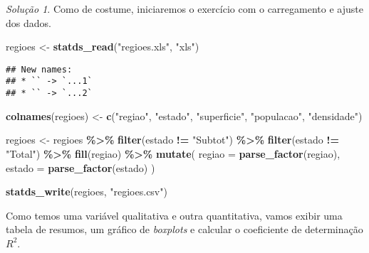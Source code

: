 \documentclass[
]{latex/krantz}
\newenvironment{Shaded}{\begin{snugshade}}{\end{snugshade}}
\newcommand{\AttributeTok}[1]{\textcolor[rgb]{0.13,0.29,0.53}{#1}}
\newcommand{\FunctionTok}[1]{\textcolor[rgb]{0.13,0.29,0.53}{\textbf{#1}}}
\newcommand{\NormalTok}[1]{#1}
\newcommand{\OtherTok}[1]{\textcolor[rgb]{0.56,0.35,0.01}{#1}}
\newcommand{\SpecialCharTok}[1]{\textcolor[rgb]{0.81,0.36,0.00}{\textbf{#1}}}
\newcommand{\StringTok}[1]{\textcolor[rgb]{0.31,0.60,0.02}{#1}}
\theoremstyle{definition}
\theoremstyle{definition}
\theoremstyle{definition}
\theoremstyle{definition}
\theoremstyle{remark}
\newtheorem*{solution}{Solução}
\begin{document}
\begin{solution}
Como de costume, iniciaremos o exercício com o carregamento e ajuste dos dados.

\begin{Shaded}
\begin{Highlighting}[]
\NormalTok{regioes }\OtherTok{\textless{}{-}} \FunctionTok{statds\_read}\NormalTok{(}\StringTok{"regioes.xls"}\NormalTok{, }\StringTok{"xls"}\NormalTok{)}
\end{Highlighting}
\end{Shaded}

\begin{verbatim}
## New names:
## * `` -> `...1`
## * `` -> `...2`
\end{verbatim}

\begin{Shaded}
\begin{Highlighting}[]
\FunctionTok{colnames}\NormalTok{(regioes) }\OtherTok{\textless{}{-}} \FunctionTok{c}\NormalTok{(}\StringTok{"regiao"}\NormalTok{, }\StringTok{"estado"}\NormalTok{, }\StringTok{"superficie"}\NormalTok{, }\StringTok{"populacao"}\NormalTok{, }\StringTok{"densidade"}\NormalTok{)}

\NormalTok{regioes }\OtherTok{\textless{}{-}}\NormalTok{ regioes }\SpecialCharTok{\%\textgreater{}\%}
              \FunctionTok{filter}\NormalTok{(estado }\SpecialCharTok{!=} \StringTok{"Subtot"}\NormalTok{) }\SpecialCharTok{\%\textgreater{}\%}
              \FunctionTok{filter}\NormalTok{(estado }\SpecialCharTok{!=} \StringTok{"Total"}\NormalTok{) }\SpecialCharTok{\%\textgreater{}\%}
              \FunctionTok{fill}\NormalTok{(regiao) }\SpecialCharTok{\%\textgreater{}\%}
              \FunctionTok{mutate}\NormalTok{(}
                \AttributeTok{regiao =} \FunctionTok{parse\_factor}\NormalTok{(regiao),}
                \AttributeTok{estado =} \FunctionTok{parse\_factor}\NormalTok{(estado)}
\NormalTok{              )}

\FunctionTok{statds\_write}\NormalTok{(regioes, }\StringTok{"regioes.csv"}\NormalTok{)}
\end{Highlighting}
\end{Shaded}

Como temos uma variável qualitativa e outra quantitativa, vamos exibir uma tabela de resumos, um gráfico de \emph{boxplots} e calcular o coeficiente de determinação \(R^2\).


\end{solution}
\end{document}
